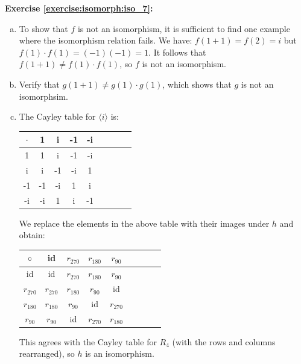 \noindent\textbf{Exercise \ref{exercise:isomorph:iso_7}:}
\begin{enumerate}[(a)]
\item
To show that $f$ is not an isomorphism, it is sufficient to find one example where the isomorphism relation fails.
We have:  $f(1+1) = f(2) = i$  but $f(1) \cdot f(1) = (-1)(-1) = 1$.  It follows that $f(1+1) \neq f(1)\cdot f(1)$, so $f$ is not an isomorphism.

\item
Verify that $g(1+1) \neq g(1)\cdot g(1)$, which shows that $g$ is not an isomorphsim.\\

\item
The Cayley table for $\langle i \rangle$ is:

\begin{multicols}{2}
\begin{table}[H]
{\small
\begin{center}
\begin{tabular}{c|cccccccc}
$\cdot$ & 1 & i & -1 & -i  \\
\hline
1        & 1 & i & -1 & -i  \\
i       & i & -1 & -i & 1  \\
-1       & -1 & -i & 1 & i \\
-i    & -i & 1 & i & -1 \\
\end{tabular}
\end{center}
}
\end{table}
\end{multicols}
We replace the elements in the above table with their images under $h$ and obtain:

\begin{multicols}{2}
\begin{table}[H]
{\small
\begin{center}
\begin{tabular}{c|cccccccc}
$\circ$ & id &$r_{270}$ &$ r_{180}$ & $r_{90}$  \\
\hline
id        & id & $r_{270}$ &$r_{180}$ & $r_{90}$  \\
$r_{270}$ & $r_{270}$ &$r_{180}$ & $r_{90}$ & id \\
$r_{180}$ &$r_{180}$ & $r_{90}$ & id& $r_{270}$  \\
$r_{90}$   & $r_{90}$ & id& $r_{270}$ &$r_{180}$ \\
\end{tabular}
\end{center}
}
\end{table}
\end{multicols}
This agrees with the Cayley table for $R_4$ (with the rows and columns rearranged), so $h$ is an isomorphism.


\end{enumerate}
